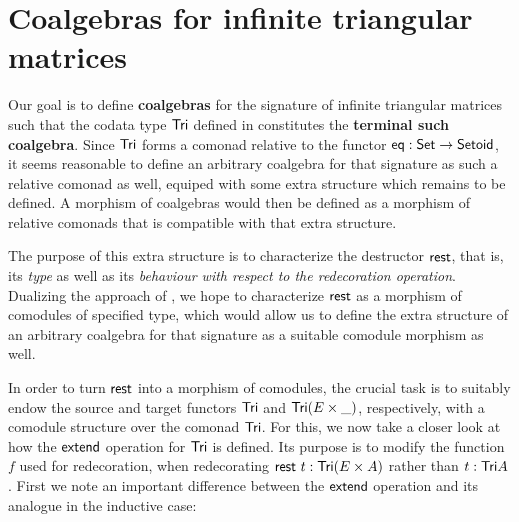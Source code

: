 \documentclass[conference,10pt]{IEEEtran}
\newcommand{\fat}[1]{\textbf{#1}}
\begin{document}
\section{Coalgebras for infinite triangular matrices}\label{sec:coalgebras_for_tri}


Our goal is to define \fat{coalgebras} for the signature of infinite triangular matrices such that 
the codata type $\mathsf{Tri}$ defined in  constitutes the \fat{terminal such coalgebra}.
Since $\mathsf{Tri}$ forms a comonad relative to the functor $\mathsf{eq}:\mathsf{Set}\to\mathsf{Setoid}$, it seems reasonable to define
an arbitrary coalgebra for that signature as such a relative comonad as well, equiped with some extra structure which remains to be defined.
A morphism of coalgebras would then be defined as a morphism of relative comonads that is compatible with that extra structure.

The purpose of this extra structure is to characterize the destructor $\mathsf{rest}$, that is, its \emph{type} as well as
its \emph{behaviour with respect to the redecoration operation}.
Dualizing the approach of \textcite{DBLP:journals/iandc/HirschowitzM10}, we hope to characterize $\mathsf{rest}$ as a morphism of 
comodules of specified type, which would allow us to define the extra structure of an arbitrary coalgebra for that signature
as a suitable comodule morphism as well.

In order to turn $\mathsf{rest}$ into a morphism of comodules, the crucial task is to suitably endow the source and target functors
$\mathsf{Tri}$ and $\mathsf{Tri}(E\times \_)$, respectively, with a comodule structure over the comonad $\mathsf{Tri}$.
For this, we now take a closer look at how the $\mathsf{extend}$ operation for $\mathsf{Tri}$ is defined. Its purpose is to 
modify the function $f$ used for redecoration, when redecorating $\mathsf{rest}~t : \mathsf{Tri}(E\times A)$ rather than $t : \mathsf{Tri} A$.
First we note an important difference between the $\mathsf{extend}$ operation and its analogue in the inductive case:
\end{document}

